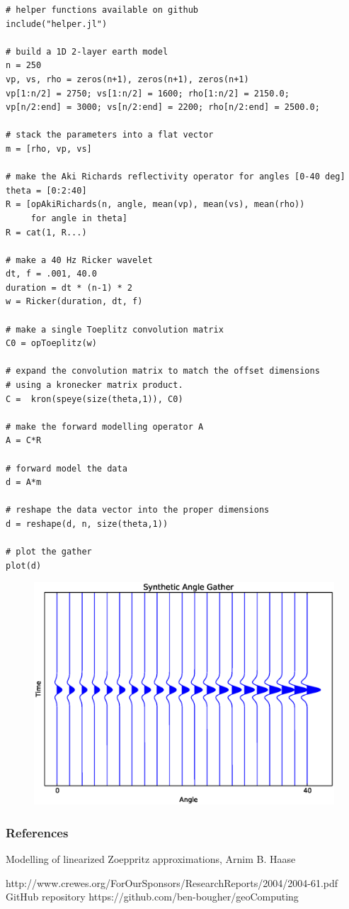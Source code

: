 \documentclass{article} %
\begin{document}
\begin{verbatim}
# helper functions available on github
include("helper.jl")
    
# build a 1D 2-layer earth model
n = 250
vp, vs, rho = zeros(n+1), zeros(n+1), zeros(n+1)
vp[1:n/2] = 2750; vs[1:n/2] = 1600; rho[1:n/2] = 2150.0;
vp[n/2:end] = 3000; vs[n/2:end] = 2200; rho[n/2:end] = 2500.0;

# stack the parameters into a flat vector
m = [rho, vp, vs]

# make the Aki Richards reflectivity operator for angles [0-40 deg]
theta = [0:2:40]
R = [opAkiRichards(n, angle, mean(vp), mean(vs), mean(rho))
     for angle in theta]
R = cat(1, R...)

# make a 40 Hz Ricker wavelet
dt, f = .001, 40.0
duration = dt * (n-1) * 2  
w = Ricker(duration, dt, f)

# make a single Toeplitz convolution matrix
C0 = opToeplitz(w)

# expand the convolution matrix to match the offset dimensions
# using a kronecker matrix product. 
C =  kron(speye(size(theta,1)), C0)

# make the forward modelling operator A
A = C*R

# forward model the data
d = A*m

# reshape the data vector into the proper dimensions
d = reshape(d, n, size(theta,1))

# plot the gather
plot(d)

\end{verbatim}



\begin{figure}[H]
\begin{center}
\includegraphics[scale=0.5]{wiggles.eps}
\end{center}
\end{figure}





\subsubsection*{References}

\small{
Modelling of linearized Zoeppritz approximations, Arnim B. Haase 

http://www.crewes.org/ForOurSponsors/ResearchReports/2004/2004-61.pdf
\\ 
GitHub repository https://github.com/ben-bougher/geoComputing 
}
\end{document}
